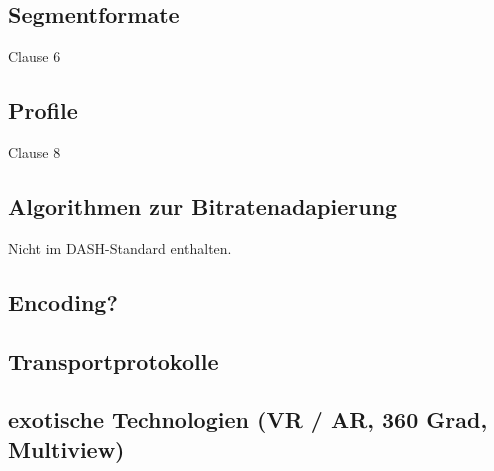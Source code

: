 \documentclass[paper = a4, fontsize = 12pt, parskip = half]{scrartcl} %
\begin{document}
\subsubsection{}

\subsection{Segmentformate}
Clause 6

\subsection{Profile}
\label{profiles}
Clause 8

\subsection{Algorithmen zur Bitratenadapierung}

Nicht im DASH-Standard enthalten. 

\subsection{Encoding?}

\subsection{Transportprotokolle}

\subsection{exotische Technologien (VR / AR, 360 Grad, Multiview)}




 \printbibliography
\end{document}
